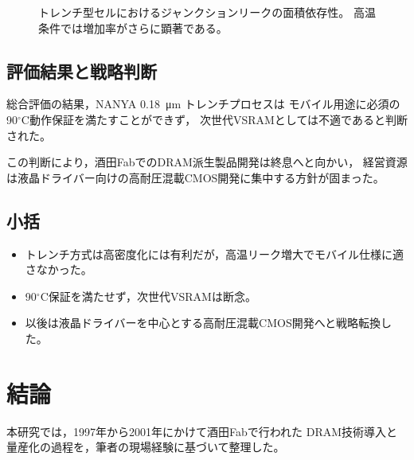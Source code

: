\documentclass[conference]{IEEEtran}
\let\meter\metre
\begin{document}
\begin{figure}[t]
\centering
{}
\caption{トレンチ型セルにおけるジャンクションリークの面積依存性。
高温条件では増加率がさらに顕著である。}
\label{fig:trench_leak}
\end{figure}

\subsection{評価結果と戦略判断}
総合評価の結果，NANYA \SI{0.18}{\micro\meter} トレンチプロセスは
モバイル用途に必須の90$^\circ$C動作保証を満たすことができず，
次世代VSRAMとしては不適であると判断された。  

この判断により，酒田FabでのDRAM派生製品開発は終息へと向かい，  
経営資源は液晶ドライバー向けの高耐圧混載CMOS開発に集中する方針が固まった。  

\subsection{小括}
\begin{itemize}
  \item トレンチ方式は高密度化には有利だが，高温リーク増大でモバイル仕様に適さなかった。
  \item 90$^\circ$C保証を満たせず，次世代VSRAMは断念。
  \item 以後は液晶ドライバーを中心とする高耐圧混載CMOS開発へと戦略転換した。
\end{itemize}

\section{結論}

本研究では，1997年から2001年にかけて酒田Fabで行われた
DRAM技術導入と量産化の過程を，筆者の現場経験に基づいて整理した。
\end{document}
